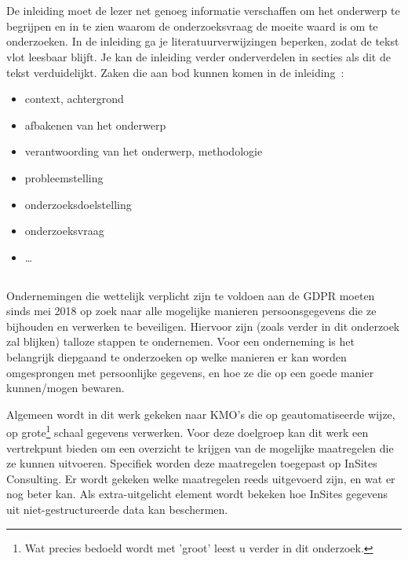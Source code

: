 
\chapter{}
\label{ch:inleiding}

De inleiding moet de lezer net genoeg informatie verschaffen om het onderwerp te begrijpen en in te zien waarom de onderzoeksvraag de moeite waard is om te onderzoeken. In de inleiding ga je literatuurverwijzingen beperken, zodat de tekst vlot leesbaar blijft. Je kan de inleiding verder onderverdelen in secties als dit de tekst verduidelijkt. Zaken die aan bod kunnen komen in de inleiding~\autocite{Pollefliet2011}:

\begin{itemize}
  \item context, achtergrond
  \item afbakenen van het onderwerp
  \item verantwoording van het onderwerp, methodologie
  \item probleemstelling
  \item onderzoeksdoelstelling
  \item onderzoeksvraag
  \item \ldots
\end{itemize}

\section{}
\label{sec:probleemstelling}

Ondernemingen die wettelijk verplicht zijn te voldoen aan de GDPR moeten sinds mei 2018 op zoek naar alle mogelijke manieren persoonsgegevens die ze bijhouden en verwerken te beveiligen. Hiervoor zijn (zoals verder in dit onderzoek zal blijken) talloze stappen te ondernemen. Voor een onderneming is het belangrijk diepgaand te onderzoeken op welke manieren er kan worden omgesprongen met persoonlijke gegevens, en hoe ze die op een goede manier kunnen/mogen bewaren. 

Algemeen wordt in dit werk gekeken naar KMO's die op geautomatiseerde wijze, op grote\footnote{Wat precies bedoeld wordt met 'groot' leest u verder in dit onderzoek.} schaal gegevens verwerken. 
Voor deze doelgroep kan dit werk een vertrekpunt bieden om een overzicht te krijgen van de mogelijke maatregelen die ze kunnen uitvoeren. 
Specifiek worden deze maatregelen toegepast op InSites Consulting. Er wordt gekeken welke maatregelen reeds uitgevoerd zijn, en wat er nog beter kan. 
Als extra-uitgelicht element wordt bekeken hoe InSites gegevens uit niet-gestructureerde data kan beschermen. 

